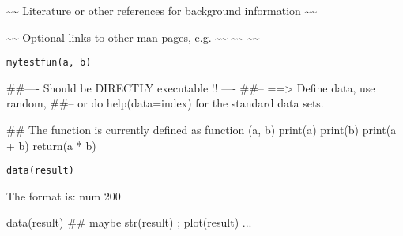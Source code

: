 \documentclass[a4paper]{book}
\begin{document}
%
\begin{References}\relax
\textasciitilde{}\textasciitilde{} Literature or other references for background information \textasciitilde{}\textasciitilde{}
\end{References}
%
\begin{SeeAlso}\relax
\textasciitilde{}\textasciitilde{} Optional links to other man pages, e.g. \textasciitilde{}\textasciitilde{}
\textasciitilde{}\textasciitilde{}  \textasciitilde{}\textasciitilde{}
\end{SeeAlso}
%
\begin{Usage}
\begin{verbatim}
mytestfun(a, b)
\end{verbatim}
\end{Usage}
%
\begin{Arguments}
\begin{ldescription}
\item[\code{a}] 


\item[\code{b}] 


\end{ldescription}
\end{Arguments}
%
\begin{Examples}
\begin{ExampleCode}
##---- Should be DIRECTLY executable !! ----
##-- ==>  Define data, use random,
##--	or do  help(data=index)  for the standard data sets.

## The function is currently defined as
function (a, b) 
{
    print(a)
    print(b)
    print(a + b)
    return(a * b)
  }
\end{ExampleCode}
\end{Examples}
%
\begin{Usage}
\begin{verbatim}
data(result)
\end{verbatim}
\end{Usage}
%
\begin{Format}
The format is:
num 200
\end{Format}
%
\begin{Examples}
\begin{ExampleCode}
data(result)
## maybe str(result) ; plot(result) ...
\end{ExampleCode}
\end{Examples}
\printindex{}
\end{document}
